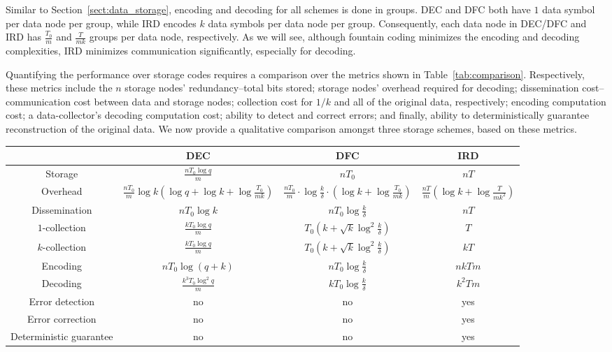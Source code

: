 \documentclass[10pt,journal,letterpaper,compsoc]{IEEEtran}
\newcommand{\0}{{\bf 0}}
\begin{document}
Similar to Section~\ref{sect:data_storage}, encoding and decoding for all schemes is done in groups. DEC and DFC both have $1$ data symbol per data node per group, while IRD encodes $k$ data symbols per data node per group. Consequently, each data node in DEC/DFC and IRD has $\frac{T_0}{m}$ and $\frac{T}{mk}$ groups per data node, respectively. As we will see, although fountain coding minimizes the encoding and decoding complexities, IRD minimizes 
communication significantly, especially for decoding.

Quantifying the performance over storage codes requires a comparison over the metrics shown in Table~\ref{tab:comparison}.
Respectively, these metrics include the $n$ storage nodes' redundancy--total bits stored; storage nodes' overhead required for decoding; dissemination cost--communication cost between data and storage nodes; collection cost for $1/k$ and all of the original data, respectively; encoding computation cost; a data-collector's decoding computation cost; ability to detect and correct errors; and finally, ability to deterministically guarantee reconstruction of the original data.
We now provide a qualitative comparison amongst three storage schemes, based on these metrics.
\begin{table*}[tbp]
\caption{Performance comparison of erasure coding schemes for storage}
\label{tab:comparison}
\begin{center}
\begin{tabular}{|c|c|c|c|}
\hline
& DEC & DFC & IRD\\  
\hline
\hline
Storage & $\frac{nT_0\log q}{m}$ & $nT_0$ &  $nT$\\
Overhead & $\frac{nT_0}{m}\log k(\log q + \log k + \log\frac{T_0}{mk})$ & $\frac{nT_0}{m}\cdot\log\frac{k}{\delta}\cdot(\log k + \log\frac{T_0}{mk})$ & $\frac{nT}{m}\left(\log k + \log\frac{T}{mk^2}\right)$\\
\hline
Dissemination & $nT_0\log k$ & $nT_0\log\frac{k}{\delta}$ & $nT$\\
$1$-collection &  $\frac{kT_0\log q}{m}$ &  $T_0\left(k+\sqrt k\log^2\frac{k}{\delta}\right)$ & $T$\\
$k$-collection &  $\frac{kT_0\log q}{m}$ &  $T_0\left(k+\sqrt k\log^2\frac{k}{\delta}\right)$ & $kT$\\
\hline
Encoding & $nT_0\log (q+k)$ & $nT_0\log\frac{k}{\delta}$ & $nkTm$\\ 
Decoding & $\frac{k^3T_0\log^2 q}{m}$ & $kT_0\log\frac{k}{\delta}$ & $k^2Tm$\\
\hline
Error detection & no & no & yes\\
Error correction & no & no & yes\\
Deterministic guarantee & no & no & yes\\
\hline
\end{tabular}
\end{center}
\end{table*}
\end{document}
